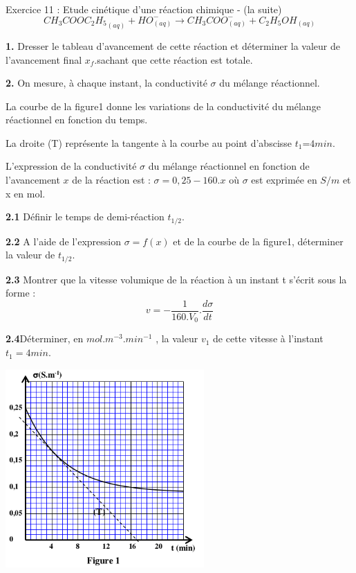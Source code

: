 \documentclass[12pt, french]{article}
\begin{document}
\begin{Box2}{Exercice 11 : Etude cinétique d’une réaction chimique - (la suite)}
	$${CH_3COOC_2H_5}_{(aq)} + HO^-_{(aq)} \rightarrow CH_3COO^-_{(aq)} + C_2H_5OH_{(aq)} $$

	\textbf{1. } Dresser le tableau d’avancement de cette réaction et déterminer la valeur de l’avancement final $x_f$.sachant que cette réaction est totale.

	\textbf{2. }On mesure, à chaque instant, la conductivité $\sigma$ du
mélange réactionnel.

La courbe de la figure1 donne les variations de la
conductivité du mélange réactionnel en fonction du temps.

La droite (T) représente la tangente à la courbe au point d’abscisse $t_1$=$4min$.

L’expression de la conductivité $\sigma $ du mélange réactionnel
en fonction de l’avancement $x$ de la réaction est :
$\sigma = 0,25-160.x$ où $\sigma$ est exprimée en $S/m$ et x en mol.

\textbf{2.1} Définir le temps de demi-réaction $t_{1/2}$.

\textbf{2.2 }A l’aide de l’expression $\sigma = f(x)$ et de la courbe de la figure1, déterminer la valeur de $t_{ 1/ 2 }$.

\textbf{2.3 }Montrer que la vitesse volumique de la réaction à un instant t s’écrit sous la forme : $$v = -\frac{1}{160.V_0}.\frac{d\sigma}{dt}$$

\textbf{2.4}Déterminer, en $mol.m^{-3}.min^{-1}$ , la valeur $v_1$ de cette vitesse à l’instant $t_1= 4min$.

  \begin{center}
	\includegraphics[width=0.57\textwidth]{./img/ex11.png}
  \end{center}



\end{Box2}
\end{document}
